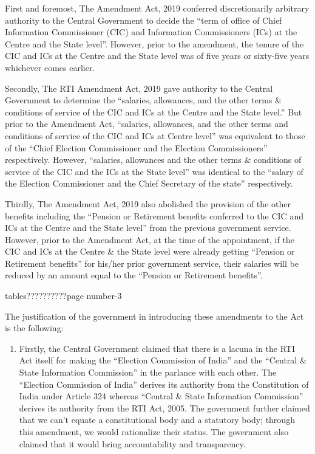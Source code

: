 \begin{multicols}{2}

\noi
First and foremost, The Amendment Act, 2019 conferred discretionarily arbitrary authority to
the Central Government to decide the “term of office of Chief Information Commissioner
(CIC) and Information Commissioners (ICs) at the Centre and the State level”. However,
prior to the amendment, the tenure of the CIC and ICs at the Centre and the State level was of
five years or sixty-five years whichever comes earlier.

\noi
Secondly, The RTI Amendment Act, 2019 gave authority to the Central Government to
determine the “salaries, allowances, and the other terms \& conditions of service of the CIC
and ICs at the Centre and the State level.” But prior to the Amendment Act, “salaries,
allowances, and the other terms and conditions of service of the CIC and ICs at Centre level”
was equivalent to those of the “Chief Election Commissioner and the Election
Commissioners” respectively. However, “salaries, allowances and the other terms
\& conditions of service of the CIC and the ICs at the State level” was identical to the “salary
of the Election Commissioner and the Chief Secretary of the state” respectively.

\noi
Thirdly, The Amendment Act, 2019 also abolished the provision of the other benefits
including the “Pension or Retirement benefits conferred to the CIC and ICs at the Centre and
the State level” from the previous government service. However, prior to the Amendment
Act, at the time of the appointment, if the CIC and ICs at the Centre \& the State level were
already getting “Pension or Retirement benefits” for his/her prior government service, their
salaries will be reduced by an amount equal to the “Pension or Retirement benefits”.



tables??????????page number-3


\noi
The justification of the government in introducing these amendments to the Act is the
following:

\begin{enumerate}
\item Firstly, the Central Government claimed that there is a lacuna in the RTI Act itself for
making the “Election Commission of India” and the “Central \& State Information
Commission” in the parlance with each other. The “Election Commission of India”
derives its authority from the Constitution of India under Article 324 whereas
“Central \& State Information Commission” derives its authority from the RTI Act,
2005. The government further claimed that we can’t equate a constitutional body and
a statutory body; through this amendment, we would rationalize their status. The
government also claimed that it would bring accountability and transparency.


\end{enumerate}
\end{multicols}
